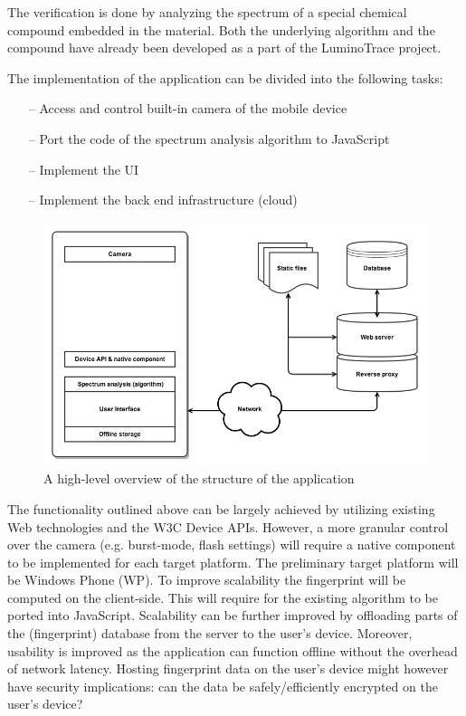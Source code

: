 \documentclass[thesis.tex]{subfiles}
\begin{document}
The verification is done by analyzing the spectrum of a special chemical compound embedded in the material. Both the underlying algorithm and the compound have already been developed as a part of the LuminoTrace project.

The implementation of the application can be divided into the following tasks:

\begin{itemize}
\item[--]Access and control built-in camera of the mobile device
\item[--]Port the code of the spectrum analysis algorithm to JavaScript
\item[--]Implement the UI
\item[--]Implement the back end infrastructure (cloud)
\end{itemize}

\begin{figure}[hb]
\centering \includegraphics[width=13.25cm]{images/diagram_0404}
\caption{A high-level overview of the structure of the application \label{fig:diagram}}
\end{figure}

The functionality outlined above can be largely achieved by utilizing existing Web technologies and the W3C Device APIs. However, a more granular control over the camera (e.g. burst-mode, flash settings) will require a native component to be implemented for each target platform. The preliminary target platform will be Windows Phone (WP). To improve scalability the fingerprint will be computed on the client-side. This will require for the existing algorithm to be ported into JavaScript. Scalability can be further improved by offloading parts of the (fingerprint) database from the server to the user's device. Moreover, usability is improved as the application can function offline without the overhead of network latency. Hosting fingerprint data on the user's device might however have security implications: can the data be safely/efficiently encrypted on the user's device?
\end{document}
